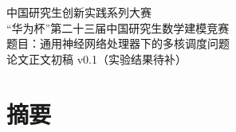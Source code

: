 \newif\ifcontest
\contesttrue


\begin{center}
{中国研究生创新实践系列大赛\\}
{“华为杯”第二十三届中国研究生数学建模竞赛\\}
\vspace{18bp}
{题目：通用神经网络处理器下的多核调度问题\\}
\vspace{12bp}
{论文正文初稿 v0.1（实验结果待补）}
\end{center}
\vspace{12bp}
\section*{摘要}

\clearpage


